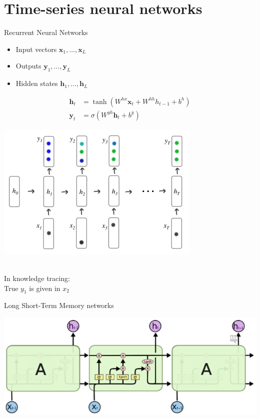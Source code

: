\documentclass{beamer}
\newcommand{\vect}[1]{\boldsymbol{#1}}
\theoremstyle{definition}
\begin{document}
\section{Time-series neural networks}
\begin{frame}{Recurrent Neural Networks}
  \begin{multicols}{2}
  
  \begin{itemize}
    \item Input vectors $\vect x_1,\ldots,\vect x_L$
    \item Outputs $\vect y_1, \ldots, \vect y_L$
    \item Hidden states $\vect h_1, \ldots, \vect h_L$
  \end{itemize}
  \begin{align*}
    \vect h_t &= \tanh(W^{hx} \vect x_t + W^{hh} h_{t-1} + b^h)\\
    \vect y_t &= \sigma(W^{yh} \vect h_t + b^y)
  \end{align*}

  \columnbreak
  \begin{center}
  \includegraphics[width=.48\textwidth]{kt_img/rnn.png}
\end{center}
    \\ In knowledge tracing: \\True $y_1$ is given in $x_2$
\end{multicols}
\end{frame}

\begin{frame}{Long Short-Term Memory networks}
  \begin{center}
    \includegraphics[width=1\textwidth]{kt_img/lstm.png}
  \end{center}
\end{frame}
\end{document}
